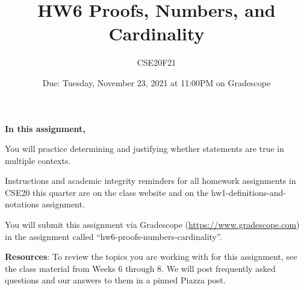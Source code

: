 \documentclass[12pt, oneside]{article}
\author{CSE20F21}
\title{HW6 Proofs, Numbers, and Cardinality}
\date{Due: Tuesday, November 23, 2021 at 11:00PM on Gradescope}
\begin{document}
\maketitle
\thispagestyle{fancy}

{\bf In this assignment,}

You will practice determining and justifying whether 
statements are true in multiple contexts.

Instructions and academic integrity reminders for all homework assignments in 
CSE20 this quarter are on the class website and on the hw1-definitions-and-notations
assignment.

You will submit this assignment via Gradescope
(\href{https://www.gradescope.com}{https://www.gradescope.com}) 
in the assignment called ``hw6-proofs-numbers-cardinality''.

{\bf Resources}: To review the topics you are working with 
for this assignment, see the class material from Weeks 6 through 8.
We will post frequently asked questions and our answers to them in a 
pinned Piazza post.
\end{document}
